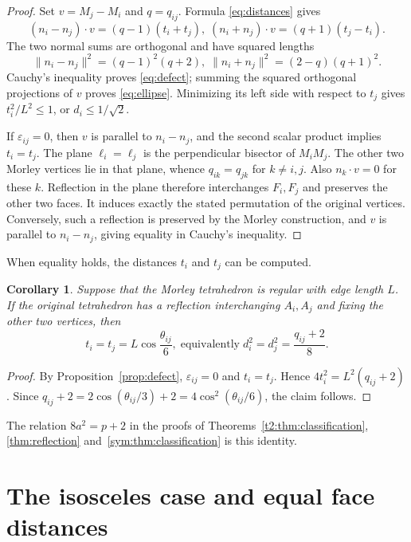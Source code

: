 \documentclass[11pt]{article}
\newtheorem{corollary}[theorem]{Corollary}
\theoremstyle{definition}
\theoremstyle{remark}
\begin{document}
\begin{proof}
Set $v=M_j-M_i$ and $q=q_{ij}$. Formula \eqref{eq:distances} gives
\[
(n_i-n_j)\cdot v=(q-1)(t_i+t_j),
\; (n_i+n_j)\cdot v=(q+1)(t_j-t_i).
\]
The two normal sums are orthogonal and have squared lengths
\[
\|n_i-n_j\|^2=(q-1)^2(q+2),
\; \|n_i+n_j\|^2=(2-q)(q+1)^2.
\]
Cauchy's inequality proves \eqref{eq:defect}; summing the squared orthogonal projections of $v$ proves \eqref{eq:ellipse}. Minimizing its left side with respect to $t_j$ gives $t_i^2/L^2\le1$, or $d_i\le1/\sqrt2$.

If $\varepsilon_{ij}=0$, then $v$ is parallel to $n_i-n_j$, and the second scalar product implies $t_i=t_j$. The plane $\ell_i=\ell_j$ is the perpendicular bisector of $M_iM_j$. The other two Morley vertices lie in that plane, whence $q_{ik}=q_{jk}$ for $k\ne i,j$. Also $n_k\cdot v=0$ for these $k$. Reflection in the plane therefore interchanges $F_i,F_j$ and preserves the other two faces. It induces exactly the stated permutation of the original vertices. Conversely, such a reflection is preserved by the Morley construction, and $v$ is parallel to $n_i-n_j$, giving equality in Cauchy's inequality.
\end{proof}

When equality holds, the distances $t_i$ and $t_j$ can be computed.

\begin{corollary}\label{cor:reflectiondistance}
Suppose that the Morley tetrahedron is regular with edge length $L$. If the original tetrahedron has a reflection interchanging $A_i,A_j$ and fixing the other two vertices, then
\[
t_i=t_j=L\cos\frac{\theta_{ij}}6,
\;\text{equivalently}\;
d_i^2=d_j^2=\frac{q_{ij}+2}8 .
\]
\end{corollary}

\begin{proof}
By Proposition~\ref{prop:defect}, $\varepsilon_{ij}=0$ and $t_i=t_j$. Hence $4t_i^2=L^2(q_{ij}+2)$. Since $q_{ij}+2=2\cos(\theta_{ij}/3)+2=4\cos^2(\theta_{ij}/6)$, the claim follows.
\end{proof}

The relation $8a^2=p+2$ in the proofs of Theorems~\ref{t2:thm:classification}, \ref{thm:reflection} and~\ref{sym:thm:classification} is this identity.

\section{The isosceles case and equal face distances}
\label{sec:isosceles}
\end{document}
